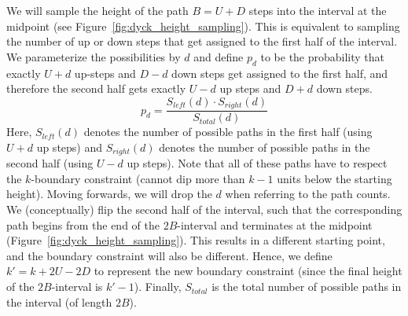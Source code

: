 We will sample the height of the path $B = U+D$ steps into the interval at the midpoint (see Figure~\ref{fig:dyck_height_sampling}).
This is equivalent to sampling the number of up or down steps that get assigned to the first half of the interval.
We parameterize the possibilities by $d$ and define $p_d$ to be the probability that exactly $U+d$ up-steps and $D-d$ down steps
get assigned to the first half, and therefore the second half gets exactly $U-d$ up steps and $D+d$ down steps.
$$
p_d = \frac{S_{left}(d)\cdot S_{right}(d)}{S_{total}(d)}
$$
Here, $S_{left}(d)$ denotes the number of possible paths in the first half (using $U+d$ up steps)
and $S_{right}(d)$ denotes the number of possible paths in the second half (using $U-d$ up steps).
Note that all of these paths have to respect the $k$-boundary constraint (cannot dip more than $k-1$ units below the starting height).
Moving forwards, we will drop the $d$ when referring to the path counts.
We (conceptually) flip the second half of the interval,
such that the corresponding path begins from the end of the $2B$-interval and terminates at the midpoint (Figure~\ref{fig:dyck_height_sampling}).
This results in a different starting point, and the boundary constraint will also be different.
Hence, we define $k' = k + 2U - 2D$  to represent the new boundary constraint (since the final height of the $2B$-interval is $k'-1$).
Finally, $S_{total}$ is the total number of possible paths in the interval (of length $2B$).

